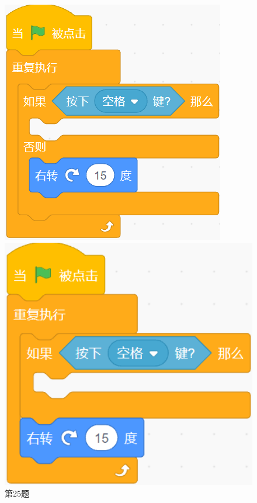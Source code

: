\documentclass[10pt, a4paper]{article}
\begin{document}
\begin{enumerate}
\begin{figure}[htbp]
\begin{minipage}[t]{.11\textwidth}
                \caption*{第25题}
            \end{minipage}
            \begin{minipage}[t]{.36\textwidth}
                \centering
                \begin{minipage}[t]{.45\textwidth}
                    \centering
                    \includegraphics[width=\textwidth]{26-1.png}
                \end{minipage}
                \begin{minipage}[t]{.5\textwidth}
                    \centering
                    \includegraphics[width=1\textwidth]{26-2.png}

\end{minipage}
\end{minipage}
\end{figure}
\end{enumerate}
\end{document}
